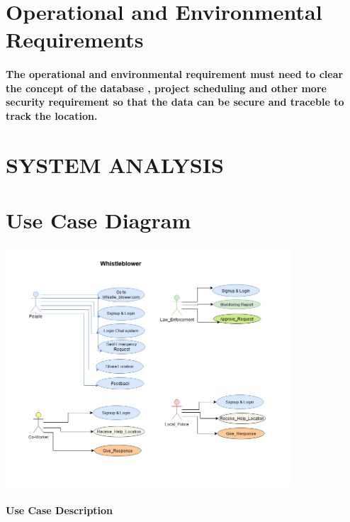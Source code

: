 \documentclass{article}
\begin{document}
\newpage
\section{Operational and Environmental Requirements}
\paragraph{The operational and environmental requirement  must need to clear the concept of the database , project scheduling and other more 
security requirement so that the data can be secure and traceble to track the location.}




\newpage


\section{SYSTEM ANALYSIS}


\section{Use Case Diagram}
\includegraphics[width=0.8\textwidth]{Use_Case_Diagram.png}
\paragraph{Use Case Description}
\end{document}
